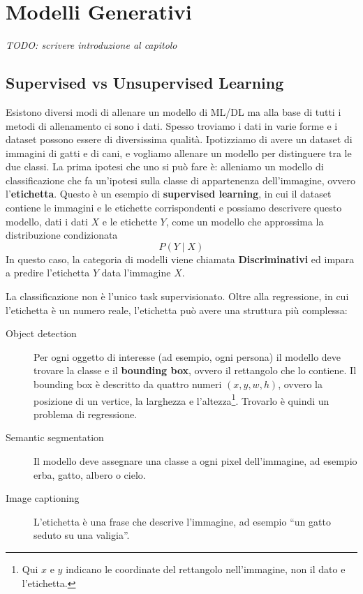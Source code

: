 \chapter{Modelli Generativi}\label{chap:generative_models}
\emph{TODO: scrivere introduzione al capitolo}

\section{Supervised vs Unsupervised Learning}\label{sec:supervised_vs_unsupervised}
Esistono diversi modi di allenare un modello di ML/DL ma alla base di tutti i metodi di allenamento ci sono i dati. Spesso troviamo i dati in varie forme e i dataset possono essere di diversissima qualità. Ipotizziamo di avere un dataset di immagini di gatti e di cani, e vogliamo allenare un modello per distinguere tra le due classi. La prima ipotesi che uno si può fare è: alleniamo un modello di classificazione che fa un'ipotesi sulla classe di appartenenza dell'immagine, ovvero l'\textbf{etichetta}. Questo è un esempio di \textbf{supervised learning}, in cui il dataset contiene le immagini e le etichette corrispondenti e possiamo descrivere questo modello, dati i dati $X$ e le etichette $Y$, come un modello che approssima la distribuzione condizionata
\[
    P(Y \mid X)
\]
In questo caso, la categoria di modelli viene chiamata \textbf{Discriminativi} ed impara a predire l'etichetta $Y$ data l'immagine $X$.

La classificazione non è l'unico task supervisionato. Oltre alla regressione, in cui l'etichetta è un numero reale, l'etichetta può avere una struttura più complessa:
\begin{description}
    \item[Object detection] Per ogni oggetto di interesse (ad esempio, ogni persona) il modello deve trovare la classe e il \textbf{bounding box}, ovvero il rettangolo che lo contiene. Il bounding box è descritto da quattro numeri $(x, y, w, h)$, ovvero la posizione di un vertice, la larghezza e l'altezza\footnote{Qui $x$ e $y$ indicano le coordinate del rettangolo nell'immagine, non il dato e l'etichetta.}. Trovarlo è quindi un problema di regressione.
    \item[Semantic segmentation] Il modello deve assegnare una classe a ogni pixel dell'immagine, ad esempio erba, gatto, albero o cielo.
    \item[Image captioning] L'etichetta è una frase che descrive l'immagine, ad esempio ``un gatto seduto su una valigia''.
\end{description}

